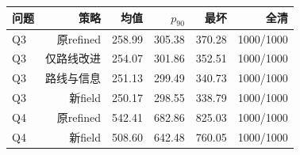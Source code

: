 \begin{tabular}{lrrrrr}
\toprule
问题 & 策略 & 均值 & $p_{90}$ & 最坏 & 全清 \\
\midrule
Q3 & 原refined & 258.99 & 305.38 & 370.28 & 1000/1000 \\
Q3 & 仅路线改进 & 254.07 & 301.86 & 352.51 & 1000/1000 \\
Q3 & 路线与信息 & 251.13 & 299.49 & 340.73 & 1000/1000 \\
Q3 & 新field & 250.17 & 298.55 & 338.79 & 1000/1000 \\
Q4 & 原refined & 542.41 & 682.86 & 825.03 & 1000/1000 \\
Q4 & 新field & 508.60 & 642.48 & 760.05 & 1000/1000 \\
\bottomrule
\end{tabular}
